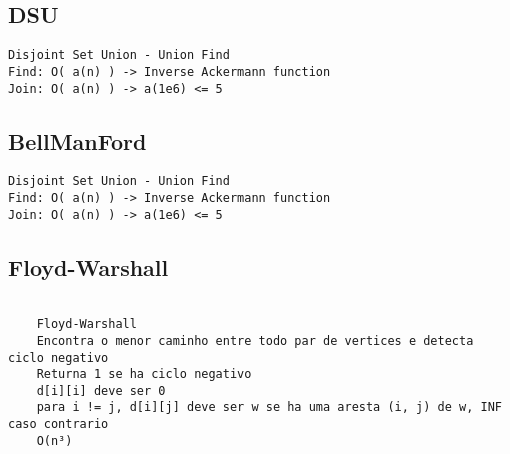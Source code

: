 \vspace{-2pt}
\subsection{DSU}
\vspace{-4pt}
\begin{lstlisting}[style=description]
Disjoint Set Union - Union Find
Find: O( a(n) ) -> Inverse Ackermann function 
Join: O( a(n) ) -> a(1e6) <= 5

\end{lstlisting}
\vspace{-5pt}
\raggedbottom
\hrulefill

\vspace{-2pt}
\subsection{BellManFord}
\vspace{-4pt}
\begin{lstlisting}[style=description]
Disjoint Set Union - Union Find
Find: O( a(n) ) -> Inverse Ackermann function 
Join: O( a(n) ) -> a(1e6) <= 5

\end{lstlisting}
\vspace{-5pt}
\raggedbottom
\hrulefill

\vspace{-2pt}
\subsection{Floyd-Warshall}
\vspace{-4pt}
\begin{lstlisting}[style=description]

	Floyd-Warshall
	Encontra o menor caminho entre todo par de vertices e detecta ciclo negativo
	Returna 1 se ha ciclo negativo
	d[i][i] deve ser 0
	para i != j, d[i][j] deve ser w se ha uma aresta (i, j) de w, INF caso contrario
	O(n³)

\end{lstlisting}
\vspace{-5pt}
\raggedbottom
\hrulefill

\vspace{-2pt}
